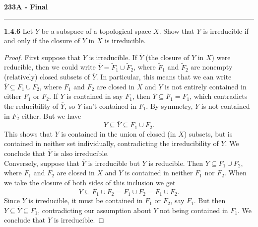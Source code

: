 \documentclass[11pt,letterpaper]{report}
\begin{document}
\begin{center}
{\bf \Large 233A - Final} %
\vspace{0.2cm}
\hrule
\end{center}

\noindent\textbf{1.4.6}
Let $Y$ be a subspace of a topological space $X$. Show that $Y$ is irreducible if and only if the closure of $Y$ in $X$ is irreducible.
\begin{proof}
	First suppose that $Y$ is irreducible. If $\overline{Y}$ (the closure of $Y$ in $X$) were reducible, then we could write $\overline{Y} = \tilde{F}_1\cup \tilde{F}_2$, where $\tilde{F}_1$ and $\tilde{F}_2$ are nonempty (relatively) closed subsets of $\overline{Y}$. In particular, this means that we can write $\overline{Y}\subseteq F_1\cup F_2$, where $F_1$ and $F_2$ are closed in $X$ and $Y$ is not entirely contained in either $F_1$ or $F_2$. If $Y$ is contained in say $F_1$, then $\overline{Y}\subseteq \overline{F}_1 = F_1$, which contradicts the reducibility of $\overline{Y}$, so $Y$ isn't contained in $F_1$. By symmetry, $Y$ is not contained in $F_2$ either. But we have
	\[
	Y\subseteq \overline{Y}\subseteq F_1\cup F_2.
	\]
	This shows that $Y$ is contained in the union of closed (in $X$) subsets, but is contained in neither set individually, contradicting the irreducibility of $Y$. We conclude that $\overline{Y}$ is also irreducible.\\

	\noindent Conversely, suppose that $\overline{Y}$ is irreducible but $Y$ is reducible. Then $Y\subseteq F_1\cup F_2$, where $F_1$ and $F_2$ are closed in $X$ and $Y$ is contained in neither $F_1$ nor $F_2$. When we take the closure of both sides of this inclusion we get
	\[
	\overline{Y}\subseteq \overline{F_1\cup F_2} = \overline{F_1}\cup \overline{F_2} = F_1\cup F_2.
	\]
	Since $\overline{Y}$ is irreducible, it must be contained in $F_1$ or $F_2$, say $F_1$. But then $Y\subseteq \overline{Y}\subseteq F_1$, contradicting our assumption about $Y$ not being contained in $F_1$. We conclude that $Y$ is irreducible.
\end{proof}
\end{document}
